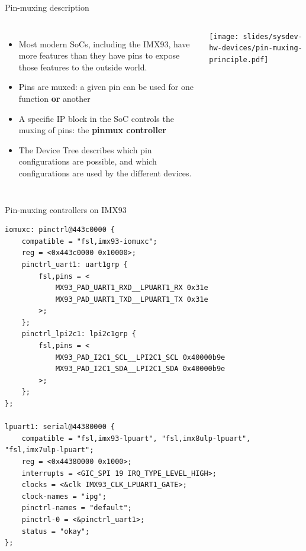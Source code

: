 \begin{frame}{Pin-muxing description}
  \begin{columns}
    \begin{itemize}
    \item Most modern SoCs, including the IMX93, have more features
      than they have pins to expose those features to the outside world.
    \item Pins are muxed: a given pin can be used for one function
      {\bf or} another
    \item A specific IP block in the SoC controls the muxing of pins:
      the {\bf pinmux controller}
    \item The Device Tree describes which pin configurations are
      possible, and which configurations are used by the different
      devices.
    \end{itemize}
    \texttt{[image: slides/sysdev-hw-devices/pin-muxing-principle.pdf]}
  \end{columns}
\end{frame}

\begin{frame}[fragile]{Pin-muxing controllers on IMX93}
  \begin{block}{}
{\tiny
\begin{verbatim}
iomuxc: pinctrl@443c0000 {
    compatible = "fsl,imx93-iomuxc";
    reg = <0x443c0000 0x10000>;
    pinctrl_uart1: uart1grp {
        fsl,pins = <
            MX93_PAD_UART1_RXD__LPUART1_RX 0x31e
            MX93_PAD_UART1_TXD__LPUART1_TX 0x31e
        >;
    };
    pinctrl_lpi2c1: lpi2c1grp {
        fsl,pins = <
            MX93_PAD_I2C1_SCL__LPI2C1_SCL 0x40000b9e
            MX93_PAD_I2C1_SDA__LPI2C1_SDA 0x40000b9e
        >;
    };
};

lpuart1: serial@44380000 {
    compatible = "fsl,imx93-lpuart", "fsl,imx8ulp-lpuart", "fsl,imx7ulp-lpuart";
    reg = <0x44380000 0x1000>;
    interrupts = <GIC_SPI 19 IRQ_TYPE_LEVEL_HIGH>;
    clocks = <&clk IMX93_CLK_LPUART1_GATE>;
    clock-names = "ipg";
    pinctrl-names = "default";
    pinctrl-0 = <&pinctrl_uart1>;
    status = "okay";
};
\end{verbatim}
}
  \end{block}
\end{frame}

